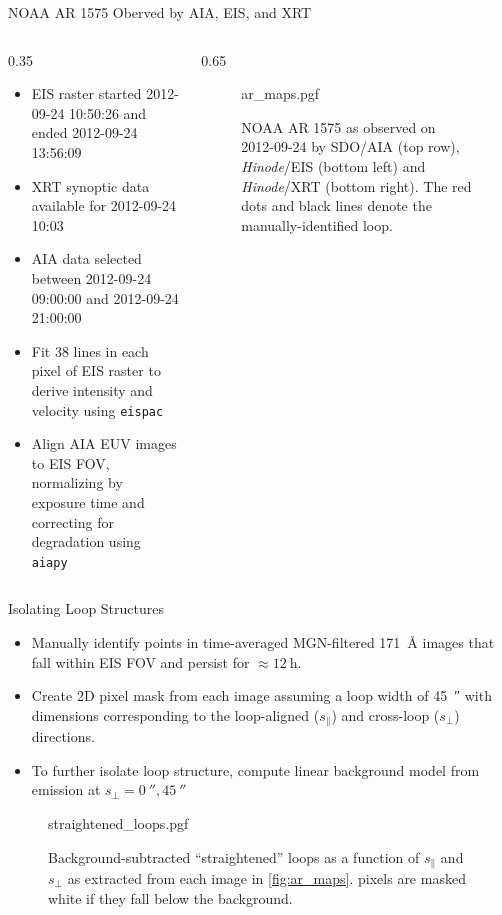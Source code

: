 \documentclass[final]{beamer}
\newlength{\colwidth}
\begin{document}
\begin{frame}[t]
\begin{columns}[t]
\begin{column}{\colwidth}
\begin{block}{NOAA AR 1575 Oberved by AIA, EIS, and XRT}
    \begin{columns}[c]
      \begin{column}{0.35\colwidth}
        \begin{itemize}
          \item EIS raster started 2012-09-24 10:50:26 and ended 2012-09-24 13:56:09
          \item XRT synoptic data available for 2012-09-24 10:03
          \item AIA data selected between 2012-09-24 09:00:00 and 2012-09-24 21:00:00
          \item Fit 38 lines in each pixel of EIS raster to derive intensity and velocity using \texttt{eispac} \citep{weberg_eispac_2023}
          \item Align AIA EUV images to EIS FOV, normalizing by exposure time and correcting for degradation using \texttt{aiapy} \citep{barnes_aiapy_2020} 
        \end{itemize}
      \end{column}
      \begin{column}{0.65\colwidth}
        \begin{figure}[H]
          \centering
          {ar_maps.pgf}
          \caption{NOAA AR 1575 as observed on 2012-09-24 by SDO/AIA (top row), \textit{Hinode}/EIS (bottom left) and \textit{Hinode}/XRT (bottom right). The red dots and black lines denote the manually-identified loop.}
          \label{fig:ar_maps}
        \end{figure}
      \end{column}
    \end{columns}

  \end{block}

  \begin{block}{Isolating Loop Structures}
    \begin{itemize}
      \item Manually identify points in time-averaged MGN-filtered \SI{171}{\angstrom} images that fall within EIS FOV and persist for $\approx\SI{12}{\hour}$.
      \item Create 2D pixel mask from each image assuming a loop width of \SI{45}{\arcsecond} with dimensions corresponding to the loop-aligned ($s_\parallel$) and cross-loop ($s_\perp$) directions.
      \item To further isolate loop structure, compute linear background model from emission at $s_\perp=\SI{0}{\arcsecond},\SI{45}{\arcsecond}$
    \end{itemize}
    \vspace{-50pt}
    \begin{figure}[H]
      \centering
      {straightened_loops.pgf}
      \caption{Background-subtracted ``straightened'' loops as a function of $s_\parallel$ and $s_\perp$ as extracted from each image in \autoref{fig:ar_maps}. pixels are masked white if they fall below the background.}
      \label{fig:straightened_loops}
    \end{figure}


\end{block}
\end{column}
\end{columns}
\end{frame}
\end{document}
